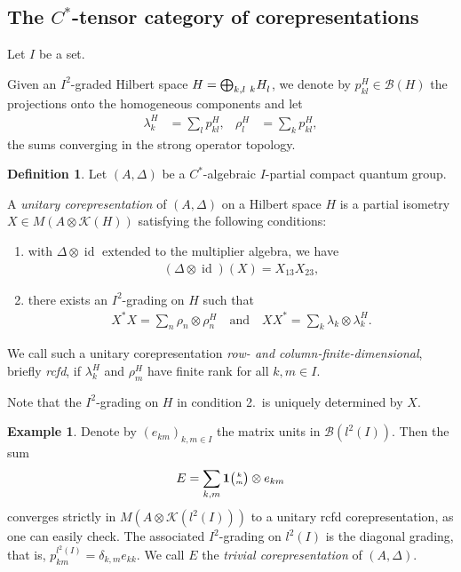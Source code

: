\documentclass[11pt]{article}
\DeclareMathOperator{\id}{id}
\newcommand{\Grt}[3]{#1{\tiny {\begin{pmatrix} #2\\#3\end{pmatrix}}}}
\newcommand{\UnitC}[2]{\Grt{\mathbf{1}}{#1}{#2}}
\newcommand{\Gr}[5]{\,\tensor*[^{#2}_{#4}]{#1}{^{#3}_{#5}}}%
\newcommand{\Grd}[3]{\Gr{#1}{}{}{#2}{#3}}
\theoremstyle{definition}
\newtheorem{Def}[Theorem]{Definition}
\newtheorem{Exa}[Theorem]{Example}
\numberwithin{equation}{section}
\begin{document}
\subsection{The $C^{*}$-tensor category of corepresentations}
Let $I$ be a set.

Given an $I^{2}$-graded Hilbert space
$H=\bigoplus_{k,l} \Grd{H}{k}{l}$, we denote by
$p_{kl}^{H} \in \mathcal{B}(H)$ the projections onto the homogeneous components and let
\begin{align*}
  \lambda^{H}_{k} &= \sum_{l} p_{kl}^{H}, &
  \rho^{H}_{l} &= \sum_{k} p_{kl}^{H},
\end{align*}
 the sums converging in the strong operator topology.


 \begin{Def} \label{def:corepresentation} Let $(A,\Delta)$ be a
   $C^{*}$-algebraic $I$-partial compact quantum group. 

   A \emph{unitary corepresentation} of $(A,\Delta)$ on a Hilbert
   space $H$ is a partial isometry $X \in M(A \otimes \mathcal{K}(H))$
   satisfying the following conditions:
   \begin{enumerate}
   \item with $\Delta \otimes \id$ extended to the multiplier algebra, we have
     \begin{align} \label{eq:corep}
     (\Delta \otimes \id)(X) = X_{13}X_{23},  
   \end{align}
 \item there exists an $I^{2}$-grading on $H$ such that
     \begin{align} \label{eq:corep-pi}
       X^{*}X= \sum_{n}\rho_{n} \otimes \rho^{H}_{n} \quad \text{and}
       \quad XX^{*} = \sum_{k} \lambda_{k} \otimes \lambda^{H}_{k}.
     \end{align}
   \end{enumerate}
   We call such a unitary corepresentation \emph{row- and column-finite-dimensional}, briefly
   \emph{rcfd}, if $\lambda^{H}_{k}$ and $\rho^{H}_{m}$ have finite rank for all $k,m\in I$.
\end{Def}
Note that the $I^{2}$-grading on $H$ in  condition 2.\ is uniquely
determined by $X$.

\begin{Exa} \label{exa:corep-trivial}
  Denote by $(e_{km})_{k,m\in I}$ the matrix units in $\mathcal{B}(l^{2}(I))$. Then the sum
  \begin{align*}
    E = \sum_{k,m} \UnitC{k}{m} \otimes e_{km} 
  \end{align*}
  converges strictly in $M(A\otimes \mathcal{K}(l^{2}(I)))$ to a unitary rcfd corepresentation, as
  one can easily check. The associated $I^{2}$-grading on $l^{2}(I)$ is the diagonal grading, that
  is, $p^{l^{2}(I)}_{km} =\delta_{k,m} e_{kk}$. We call $E$ the \emph{trivial corepresentation} of
  $(A,\Delta)$.
\end{Exa}
\end{document}
